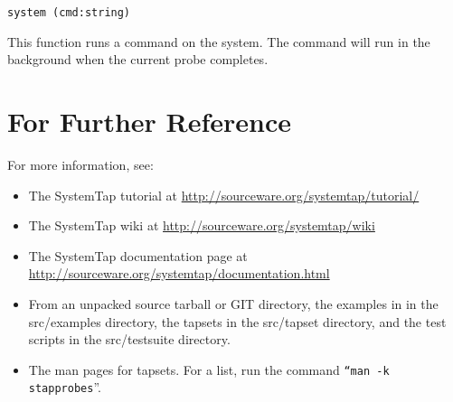 \documentclass[twoside,english]{article}
\newenvironment{vindent}
{\begin{list}{}{\setlength{\listparindent}{6pt}}
\item[]}
{\end{list}}
\begin{document}
\begin{vindent}
\begin{verbatim}
system (cmd:string)
\end{verbatim}
\end{vindent}
This function runs a command on the system. The command will run in the background
when the current probe completes.


\section{For Further Reference\label{sec:For-Further-Reference}}

For more information, see:
\begin{itemize}
\item The SystemTap tutorial at \url{http://sourceware.org/systemtap/tutorial/}
\item The SystemTap wiki at \url{http://sourceware.org/systemtap/wiki}
\item The SystemTap documentation page at \url{http://sourceware.org/systemtap/documentation.html}
\item From an unpacked source tarball or GIT directory, the examples in in the
src/examples directory, the tapsets in the src/tapset directory, and the
test scripts in the src/testsuite directory.
\item The man pages for tapsets. For a list, run the command \texttt{{}``man -k
stapprobes}''.
\end {itemize}

\setcounter{secnumdepth}{0}
\newpage{}
\printindex{}
\end{document}
